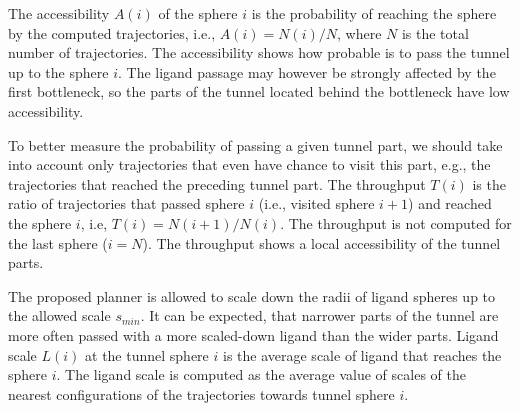 \documentclass{svmult}
\def\R{\mathbb{R}}
\def\smin{s_{min}}
\begin{document}
The accessibility $A(i)$ of the sphere $i$ is the probability of reaching the sphere by the computed trajectories,
i.e., $A(i)=N(i) / N$, where $N$ is the total number of trajectories.
The accessibility  shows how probable is to pass the tunnel up to the sphere $i$.
The  ligand passage may however be strongly affected by the first bottleneck, so the parts of the tunnel located behind
the bottleneck have low accessibility.

To better measure the probability of passing a given tunnel part, we should take into account only trajectories that even have chance
to visit this part, e.g., the trajectories that reached the preceding tunnel part.
The throughput $T(i)$ is the ratio of trajectories that passed sphere $i$ (i.e., visited sphere $i+1$) and reached the sphere $i$,
i.e, $T(i) = N(i+1) / N(i)$. 
The throughput is not computed for the last sphere ($i=N$).
The throughput shows a local accessibility of the tunnel parts.


The proposed planner is allowed to scale down the radii of ligand spheres up to the allowed scale $\smin$. 
It can be expected, that narrower parts of the tunnel are more often passed with a more scaled-down ligand than
the wider parts.
Ligand scale $L(i)$ at the tunnel sphere $i$ is the average scale of ligand that reaches the sphere $i$.
The ligand scale is computed as the average value of scales of the nearest configurations of the trajectories towards tunnel sphere
$i$.

\end{document}
